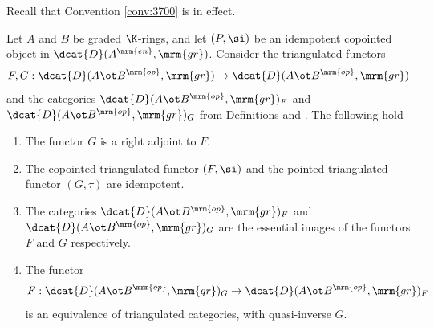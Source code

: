 Recall that Convention \ref{conv:3700} is in effect. 

\begin{thm} \label{thm:4000}
Let $A$ and $B$ be graded $\K$-rings, and let $(P, \si)$ be an 
idempotent copointed object in $\dcat{D}(A^{\mrm{en}}, \mrm{gr})$.
Consider the triangulated functors 
\[ F, G : \dcat{D}(A \ot B^{\mrm{op}}, \mrm{gr}) \to 
\dcat{D}(A \ot B^{\mrm{op}}, \mrm{gr}) \]
and the categories 
$\dcat{D}(A \ot B^{\mrm{op}}, \mrm{gr})_F$ and 
$\dcat{D}(A \ot B^{\mrm{op}}, \mrm{gr})_G$ 
from Definitions \tup{\ref{dfn:3996}}
and \tup{\ref{dfn:3997}}. The following hold\tup{:}
\begin{enumerate}
\item The functor $G$ is a right adjoint to $F$. 

\item The copointed triangulated functor $(F, \si)$ and the 
pointed triangulated functor $(G, \tau)$ are idempotent.

\item The categories  $\dcat{D}(A \ot B^{\mrm{op}}, \mrm{gr})_F$ and 
$\dcat{D}(A \ot B^{\mrm{op}}, \mrm{gr})_G$ are the essential 
images of the functors $F$ and $G$ respectively. 

\item The functor 
\[ F : \dcat{D}(A \ot B^{\mrm{op}}, \mrm{gr})_G \to 
\dcat{D}(A \ot B^{\mrm{op}}, \mrm{gr})_F \]
is an equivalence of triangulated categories, with quasi-inverse $G$. 
\end{enumerate}
\end{thm}

